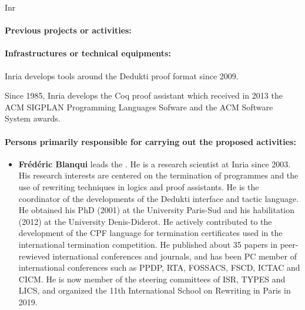 \begin{sitedescription}{Inr}
\paragraph{Previous projects or activities:}


\begin{compactitem}
\item 
\end{compactitem}

\paragraph{Infrastructures or technical equipments:}


\begin{compactitem}
\item Inria develops tools around the Dedukti proof format since 2009.
\item Since 1985, Inria develops the Coq proof assistant which
  received in 2013 the ACM SIGPLAN Programming Languages Sofware and
  the ACM Software System awards.
\end{compactitem}

\paragraph{Persons primarily responsible for carrying out the proposed activities:}

\begin{itemize} %

\item{\bf Frédéric Blanqui} leads the . He is a research scientist at Inria since 2003. His research interests are centered on the termination of programmes and the use of rewriting techniques in logics and proof assistants. He is the coordinator of the developments of the Dedukti interface and tactic language. He obtained his PhD (2001) at the University Paris-Sud and his habilitation (2012) at the University Denis-Diderot. He actively contributed to the development of the CPF language for termination certificates used in the international termination competition. He published about 35 papers in peer-rewieved international conferences and journals, and has been PC member of international conferences such as PPDP, RTA, FOSSACS, FSCD, ICTAC and CICM. He is now member of the steering committees of ISR, TYPES and LICS, and organized the 11th International School on Rewriting in Paris in 2019.


\end{itemize}
\end{sitedescription}
